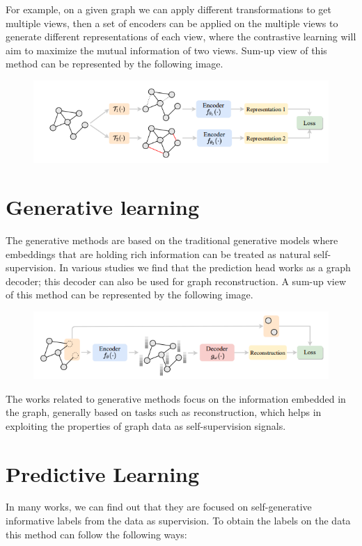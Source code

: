 \documentclass[a4paper,11pt]{report}
\begin{document}
For example, on a given graph we can apply different transformations to get multiple views, then a set of encoders can be applied on the multiple views to generate different representations of each view, where the contrastive learning will aim to maximize the mutual information of two views. Sum-up view of this method can be represented by the following image.

\begin{figure}[h]
	\centering
	\hspace{21pt}
	\includegraphics[width=.70\linewidth]{ssgnn4.png}
\end{figure}
\section{Generative learning}
The generative methods are based on the traditional generative models where embeddings that are holding rich information can be treated as natural self-supervision. In various studies we find that the prediction head works as a graph decoder; this decoder can also be used for graph reconstruction. A sum-up view of this method can be represented by the following image.
\begin{figure}[h]
	\centering
	\hspace{21pt}
	\includegraphics[width=.70\linewidth]{ssgnn5.png}
\end{figure}

The works related to generative methods focus on the information embedded in the graph, generally based on tasks such as reconstruction, which helps in exploiting the properties of graph data as self-supervision signals.

\section{Predictive Learning}
In many works, we can find out that they are focused on self-generative informative labels from the data as supervision. To obtain the labels on the data this method can follow the following ways:
\end{document}

